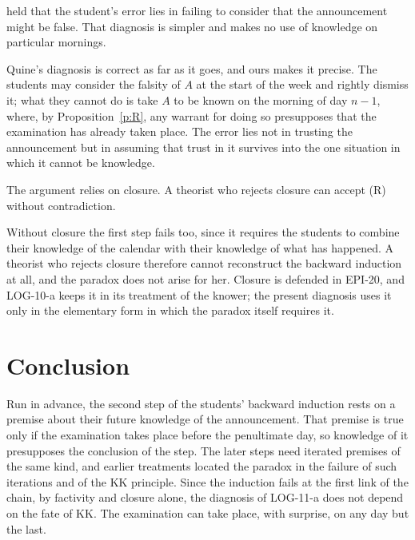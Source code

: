\documentclass{situationist-preprint}
\begin{document}
\begin{objection}
\citet{Quine1953} held that the student's error lies in failing to consider that the announcement might be false. That diagnosis is simpler and makes no use of knowledge on particular mornings.
\end{objection}

\begin{reply}
Quine's diagnosis is correct as far as it goes, and ours makes it precise. The students may consider the falsity of $A$ at the start of the week and rightly dismiss it; what they cannot do is take $A$ to be known on the morning of day $n-1$, where, by Proposition~\ref{p:R}, any warrant for doing so presupposes that the examination has already taken place. The error lies not in trusting the announcement but in assuming that trust in it survives into the one situation in which it cannot be knowledge.
\end{reply}

\begin{objection}[Closure]
The argument relies on closure. A theorist who rejects closure can accept (R) without contradiction.
\end{objection}

\begin{reply}
Without closure the first step fails too, since it requires the students to combine their knowledge of the calendar with their knowledge of what has happened. A theorist who rejects closure therefore cannot reconstruct the backward induction at all, and the paradox does not arise for her. Closure is defended in EPI-20, and LOG-10-a keeps it in its treatment of the knower; the present diagnosis uses it only in the elementary form in which the paradox itself requires it.
\end{reply}

\section{Conclusion}

Run in advance, the second step of the students' backward induction rests on a premise about their future knowledge of the announcement. That premise is true only if the examination takes place before the penultimate day, so knowledge of it presupposes the conclusion of the step. The later steps need iterated premises of the same kind, and earlier treatments located the paradox in the failure of such iterations and of the KK principle. Since the induction fails at the first link of the chain, by factivity and closure alone, the diagnosis of LOG-11-a does not depend on the fate of KK. The examination can take place, with surprise, on any day but the last.
\end{document}
